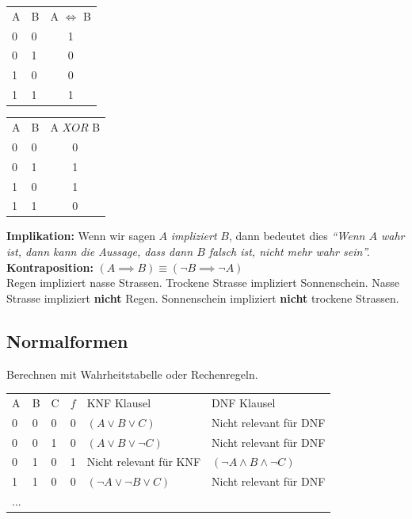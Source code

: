 \documentclass[8pt,landscape]{scrartcl}
\begin{document}
\begin{multicols}{3}
\begin{tabular}{ll||c}
A & B & A $\iff$ B  \\ \cline{1-3}
0 & 0 &           1  \\
0 & 1 &           0  \\
1 & 0 &           0  \\
1 & 1 &           1
\end{tabular}
\begin{tabular}{ll||c}
A & B & A $XOR$ B  \\ \cline{1-3}
0 & 0 &           0  \\
0 & 1 &           1  \\
1 & 0 &           1  \\
1 & 1 &           0  \\
\end{tabular}

\textbf{Implikation:} Wenn wir sagen $A$ \textit{impliziert} $B$, dann bedeutet dies \textit{``Wenn $A$ wahr ist, dann kann die Aussage, dass dann $B$ falsch ist, nicht mehr wahr sein''.}\\
\textbf{Kontraposition:} $(A \implies B) \equiv (\lnot B \implies \lnot A)$\\
Regen impliziert nasse Strassen.
Trockene Strasse impliziert Sonnenschein.
Nasse Strasse impliziert \textbf{nicht} Regen.
Sonnenschein impliziert \textbf{nicht} trockene Strassen.


\subsection{Normalformen}
Berechnen mit Wahrheitstabelle oder Rechenregeln.\\

\begin{small}
\begin{tabular}{lll|c | ll}
A & B & C & $f$ & KNF Klausel                      & DNF Klausel                     \\ \cline{1-6} 
0 & 0 & 0 & 0   &  $(A \lor B \lor C)$             & Nicht relevant für DNF          \\
0 & 0 & 1 & 0   &  $(A \lor B \lor \lnot C)$       & Nicht relevant für DNF          \\
0 & 1 & 0 & 1   &  Nicht relevant für KNF          & $(\lnot A \land B \land \lnot C)$ \\
1 & 1 & 0 & 0   &  $(\lnot A \lor \lnot B \lor C)$ & Nicht relevant für DNF          \\
... & & & 
\end{tabular}
\end{small}


\end{multicols}
\end{document}
